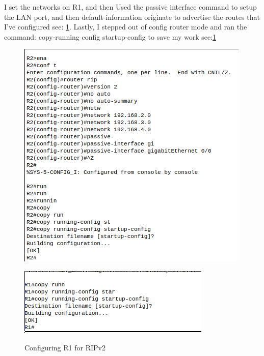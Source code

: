 \documentclass[../EngineeringJournal_CDavis.tex]{subfiles}
\begin{document}
I set the networks on R1, and then Used the passive interface command to setup the LAN  port, and then
default-information originate to advertise the routes that I've configured see:
\ref{config7a}.
\hfill\break
Lastly, I stepped out of config router mode and ran the command: copy-running config
startup-config to save my work see:\ref{config7a}

\begin{figure}[!hbt]
  \begin{minipage}[c]{0.4\linewidth}
    \centering
    \includegraphics[scale=0.24]{Figures/2020-01-31-031204_420x418_scrot.png}
    \label{config7aNetSetR1}
  \end{minipage}\hfill
  \begin{minipage}[c]{0.4\linewidth}
    \centering
    \includegraphics[scale=0.4]{Figures/2020-01-31-030648_347x122_scrot.png}
    \label{config7afinishR1}
  \end{minipage}
  \caption{Configuring R1 for RIPv2}\label{config7a}
\end{figure}
\end{document}
